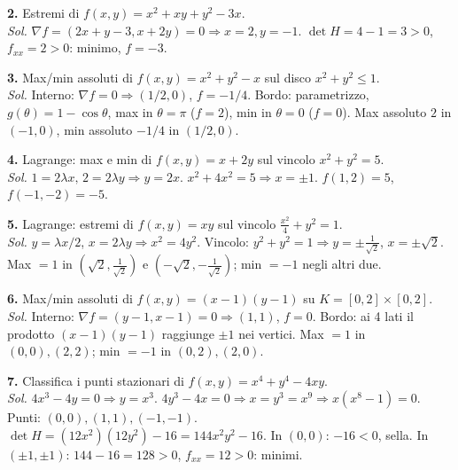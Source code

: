 \documentclass[11pt,a4paper]{article}
\begin{document}
\textbf{2.} Estremi di $f(x,y)=x^2+xy+y^2-3x$.\\
\emph{Sol.} $\nabla f=(2x+y-3,x+2y)=0\Rightarrow x=2,y=-1$. $\det H=4-1=3>0$, $f_{xx}=2>0$: minimo, $f=-3$.

\textbf{3.} Max/min assoluti di $f(x,y)=x^2+y^2-x$ sul disco $x^2+y^2\le 1$.\\
\emph{Sol.} Interno: $\nabla f=0\Rightarrow (1/2,0)$, $f=-1/4$. Bordo: parametrizzo, $g(\theta)=1-\cos\theta$, max in $\theta=\pi$ ($f=2$), min in $\theta=0$ ($f=0$). Max assoluto $2$ in $(-1,0)$, min assoluto $-1/4$ in $(1/2,0)$.

\textbf{4.} Lagrange: max e min di $f(x,y)=x+2y$ sul vincolo $x^2+y^2=5$.\\
\emph{Sol.} $1=2\lambda x,\,2=2\lambda y\Rightarrow y=2x$. $x^2+4x^2=5\Rightarrow x=\pm 1$. $f(1,2)=5$, $f(-1,-2)=-5$.

\textbf{5.} Lagrange: estremi di $f(x,y)=xy$ sul vincolo $\tfrac{x^2}{4}+y^2=1$.\\
\emph{Sol.} $y=\lambda x/2$, $x=2\lambda y\Rightarrow x^2=4y^2$. Vincolo: $y^2+y^2=1\Rightarrow y=\pm\tfrac{1}{\sqrt 2}$, $x=\pm\sqrt 2$. Max $=1$ in $(\sqrt 2,\tfrac{1}{\sqrt 2})$ e $(-\sqrt 2,-\tfrac{1}{\sqrt 2})$; min $=-1$ negli altri due.

\textbf{6.} Max/min assoluti di $f(x,y)=(x-1)(y-1)$ su $K=[0,2]\times[0,2]$.\\
\emph{Sol.} Interno: $\nabla f=(y-1,x-1)=0\Rightarrow (1,1)$, $f=0$. Bordo: ai 4 lati il prodotto $(x-1)(y-1)$ raggiunge $\pm 1$ nei vertici. Max $=1$ in $(0,0),(2,2)$; min $=-1$ in $(0,2),(2,0)$.

\textbf{7.} Classifica i punti stazionari di $f(x,y)=x^4+y^4-4xy$.\\
\emph{Sol.} $4x^3-4y=0\Rightarrow y=x^3$. $4y^3-4x=0\Rightarrow x=y^3=x^9\Rightarrow x(x^8-1)=0$. Punti: $(0,0),(1,1),(-1,-1)$. $\det H=(12x^2)(12y^2)-16=144x^2y^2-16$. In $(0,0)$: $-16<0$, sella. In $(\pm 1,\pm 1)$: $144-16=128>0$, $f_{xx}=12>0$: minimi.
\end{document}
